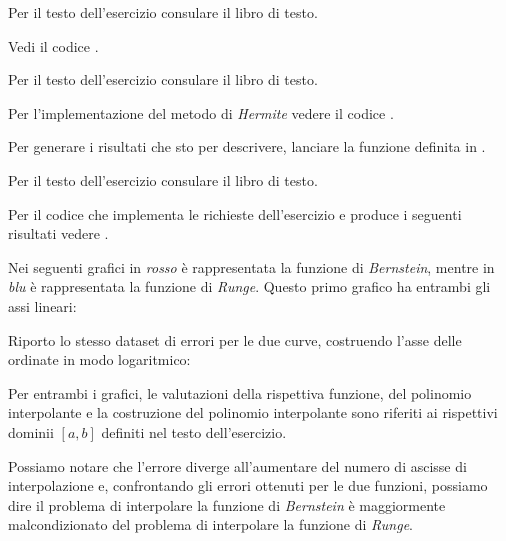 \begin{exercise}[4.8]
Per il testo dell'esercizio consulare il libro di testo.
\end{exercise}
Vedi il codice . 

\begin{exercise}[4.9]
Per il testo dell'esercizio consulare il libro di testo.
\end{exercise}
Per l'implementazione del metodo di \emph{Hermite} vedere il codice
.

Per generare i risultati
che sto per descrivere, lanciare la funzione definita in
. 
\begin{center} 

\end{center}
\begin{center} 

\end{center}

\begin{center} 

\end{center}

\begin{center} 

\end{center}

\begin{exercise}[4.11]
Per il testo dell'esercizio consulare il libro di testo.
\end{exercise}
Per il codice che implementa le richieste dell'esercizio e produce i seguenti
risultati vedere .

Nei seguenti grafici in
\emph{rosso} \`e rappresentata la funzione di \emph{Bernstein}, mentre in \emph{blu} \`e rappresentata la funzione di
\emph{Runge}. Questo primo grafico ha entrambi gli assi lineari:
\begin{center}   

\end{center}
Riporto lo stesso dataset di errori per le due curve, costruendo l'asse delle
ordinate in modo logaritmico:
\begin{center}  

\end{center}
Per entrambi i grafici, le valutazioni della rispettiva funzione, del polinomio
interpolante e la costruzione del polinomio interpolante sono riferiti ai
rispettivi dominii $[a,b]$ definiti nel testo dell'esercizio.

Possiamo notare che l'errore diverge all'aumentare del numero di ascisse di
interpolazione e, confrontando gli errori ottenuti per le due funzioni, possiamo
dire il problema di interpolare la funzione di \emph{Bernstein} \`e maggiormente
malcondizionato del problema di interpolare la funzione di \emph{Runge}.






